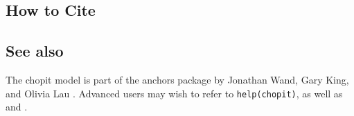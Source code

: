 \subsection* {How to Cite} 




\subsection* {See also}
The {\sc chopit} model is part of the anchors package by Jonathan
Wand, Gary King, and Olivia Lau \citep{WanKinLau07}. Advanced users
may wish to refer to \texttt{help(chopit)}, as well as
\cite{KinMurSal04} and \cite{KinWan07}. 
